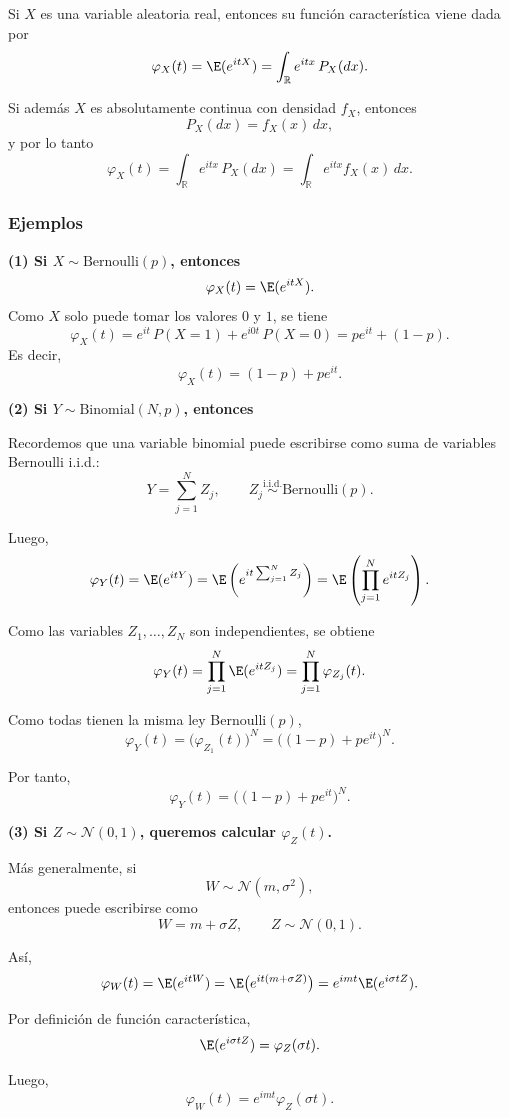 Si $X$ es una variable aleatoria real, entonces su función característica viene dada por
\[
\varphi_X(t)=\E(e^{itX})=\int_{\mathbb{R}} e^{itx}\,P_X(dx).
\]

Si además $X$ es absolutamente continua con densidad $f_X$, entonces
\[
P_X(dx)=f_X(x)\,dx,
\]
y por lo tanto
\[
\varphi_X(t)
=
\int_{\mathbb{R}} e^{itx}\,P_X(dx)
=
\int_{\mathbb{R}} e^{itx}f_X(x)\,dx.
\]

\subsubsection*{Ejemplos}

\textbf{(1) Si $X\sim \mathrm{Bernoulli}(p)$, entonces}
\[
\varphi_X(t)=\E(e^{itX}).
\]
Como $X$ solo puede tomar los valores $0$ y $1$, se tiene
\[
\varphi_X(t)
=
e^{it}\,P(X=1)+e^{i0t}\,P(X=0)
=
pe^{it}+(1-p).
\]
Es decir,
\[
\varphi_X(t)=(1-p)+pe^{it}.
\]

\medskip

\textbf{(2) Si $Y\sim \mathrm{Binomial}(N,p)$, entonces}

Recordemos que una variable binomial puede escribirse como suma de variables Bernoulli i.i.d.:
\[
Y=\sum_{j=1}^{N} Z_j,
\qquad Z_j \stackrel{\mathrm{i.i.d.}}{\sim} \mathrm{Bernoulli}(p).
\]

Luego,
\[
\varphi_Y(t)=\E(e^{itY})
=
\E\left(e^{it\sum_{j=1}^{N} Z_j}\right)
=
\E\left(\prod_{j=1}^{N} e^{itZ_j}\right).
\]

Como las variables $Z_1,\dots,Z_N$ son independientes, se obtiene
\[
\varphi_Y(t)
=
\prod_{j=1}^{N}\E(e^{itZ_j})
=
\prod_{j=1}^{N}\varphi_{Z_j}(t).
\]

Como todas tienen la misma ley Bernoulli$(p)$,
\[
\varphi_Y(t)=\big(\varphi_{Z_1}(t)\big)^N
=
\big((1-p)+pe^{it}\big)^N.
\]

Por tanto,
\[
\varphi_Y(t)=\big((1-p)+pe^{it}\big)^N.
\]

\medskip

\textbf{(3) Si $Z\sim \mathcal{N}(0,1)$, queremos calcular $\varphi_Z(t)$.}

Más generalmente, si
\[
W\sim \mathcal{N}(m,\sigma^2),
\]
entonces puede escribirse como
\[
W=m+\sigma Z,
\qquad Z\sim \mathcal{N}(0,1).
\]

Así,
\[
\varphi_W(t)=\E(e^{itW})
=
\E\big(e^{it(m+\sigma Z)}\big)
=
e^{imt}\E(e^{i\sigma t Z}).
\]

Por definición de función característica,
\[
\E(e^{i\sigma t Z})=\varphi_Z(\sigma t).
\]

Luego,
\[
\varphi_W(t)=e^{imt}\varphi_Z(\sigma t).
\]


